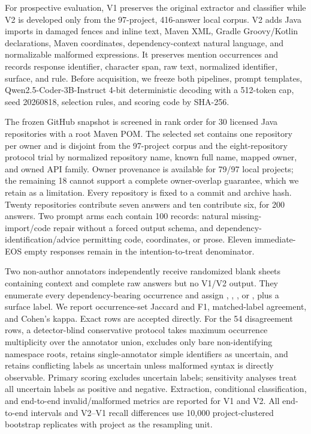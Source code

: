 \documentclass[pdflatex,sn-basic]{sn-jnl}
\newcommand{\codeid}[1]{\texttt{\detokenize{#1}}}
\begin{document}
For prospective evaluation, V1 preserves the original extractor and classifier while V2 is developed only from the 97-project, 416-answer local corpus. V2 adds Java imports in damaged fences and inline text, Maven XML, Gradle Groovy/Kotlin declarations, Maven coordinates, dependency-context natural language, and normalizable malformed expressions. It preserves mention occurrences and records response identifier, character span, raw text, normalized identifier, surface, and rule. Before acquisition, we freeze both pipelines, prompt templates, Qwen2.5-Coder-3B-Instruct 4-bit deterministic decoding with a 512-token cap, seed 20260818, selection rules, and scoring code by SHA-256.

The frozen GitHub snapshot is screened in rank order for 30 licensed Java repositories with a root Maven POM. The selected set contains one repository per owner and is disjoint from the 97-project corpus and the eight-repository protocol trial by normalized repository name, known full name, mapped owner, and owned API family. Owner provenance is available for 79/97 local projects; the remaining 18 cannot support a complete owner-overlap guarantee, which we retain as a limitation. Every repository is fixed to a commit and archive hash. Twenty repositories contribute seven answers and ten contribute six, for 200 answers. Two prompt arms each contain 100 records: natural missing-import/code repair without a forced output schema, and dependency-identification/advice permitting code, coordinates, or prose. Eleven immediate-EOS empty responses remain in the intention-to-treat denominator.

Two non-author annotators independently receive randomized blank sheets containing context and complete raw answers but no V1/V2 output. They enumerate every dependency-bearing occurrence and assign \codeid{valid}, \codeid{invalid}, \codeid{malformed}, or \codeid{uncertain}, plus a surface label. We report occurrence-set Jaccard and F1, matched-label agreement, and Cohen's kappa. Exact rows are accepted directly. For the 54 disagreement rows, a detector-blind conservative protocol takes maximum occurrence multiplicity over the annotator union, excludes only bare non-identifying namespace roots, retains single-annotator simple identifiers as uncertain, and retains conflicting labels as uncertain unless malformed syntax is directly observable. Primary scoring excludes uncertain labels; sensitivity analyses treat all uncertain labels as positive and negative. Extraction, conditional classification, and end-to-end invalid/malformed metrics are reported for V1 and V2. All end-to-end intervals and V2--V1 recall differences use 10,000 project-clustered bootstrap replicates with project as the resampling unit.
\end{document}

